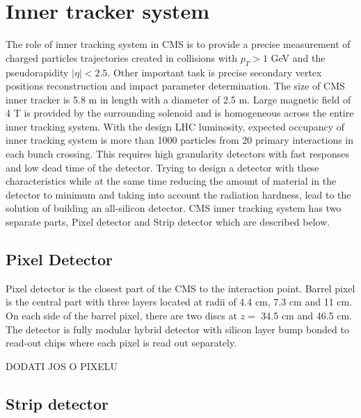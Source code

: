 
\section{Inner tracker system}

The role of inner tracking system in CMS is to provide a precise measurement of charged particles trajectories created in collisions with $p_T>1$ GeV and the pseudorapidity $|\eta|<2.5$. Other important task is precise secondary vertex positions reconstruction and impact parameter determination. The size of CMS inner tracker is 5.8 m in length with a diameter of 2.5 m. Large magnetic field of 4 T is provided by the surrounding solenoid and is homogeneous across the entire inner tracking system. With the design LHC luminosity, expected occupancy of inner tracking system is more than 1000 particles from 20 primary interactions in each bunch crossing. This requires high granularity detectors with fast responses and low dead time of the detector. Trying to design a detector with these characteristics while at the same time reducing the amount of material in the detector to minimum and taking into account the radiation hardness, lead to the solution of building an all-silicon detector. CMS inner tracking system has two separate parts, Pixel detector and Strip detector which are described below.    


\subsection{Pixel Detector}

Pixel detector is the closest part of the CMS to the interaction point. Barrel pixel is the central part with three layers located at radii of 4.4 cm, 7.3 cm and 11 cm. On each side of the barrel pixel, there are two discs at $z=$ 34.5 cm and 46.5 cm. The detector is fully modular hybrid detector with silicon layer bump bonded to read-out chips where each pixel is read out separately. 

DODATI JOS O PIXELU


\subsection{Strip detector}

